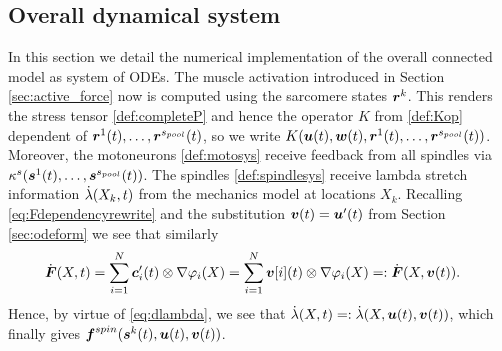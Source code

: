 \subsection{Overall dynamical system}
In this section we detail the numerical implementation of the overall connected model as system of ODEs.
The muscle activation introduced in Section \ref{sec:active_force} now is computed using the sarcomere states $\boldsymbol{r}^k$.
This renders the stress tensor \eqref{def:completeP} and hence the operator $K$ from \eqref{def:Kop} dependent of $\boldsymbol{r}^1(t),\ldots,\boldsymbol{r}^{s_{pool}}(t)$,
so we write $K(\boldsymbol{u}(t),\boldsymbol{w}(t),\boldsymbol{r}^1(t),\ldots,\boldsymbol{r}^{s_{pool}}(t))$.
Moreover, the motoneurons \eqref{def:motosys} receive feedback from all spindles via $\kappa^s(\boldsymbol{s}^1(t),\ldots,\boldsymbol{s}^{s_{pool}}(t))$.
The spindles \ref{def:spindlesys} receive lambda stretch information $\dot{\lambda}(X_k,t)$ from the mechanics model at locations $X_k$.
Recalling \eqref{eq:Fdependencyrewrite} and the substitution $\boldsymbol{v}(t) = \boldsymbol{u}'(t)$ from Section \ref{sec:odeform} we see that similarly
\begin{align}
	\dot{\boldsymbol{F}}(X,t) &= \sum\limits_{i=1}^{N} \boldsymbol{c}'_i(t)\otimes \nabla\varphi_i(X) = \sum\limits_{i=1}^{N} \boldsymbol{v}[i](t)\otimes \nabla\varphi_i(X) =: \dot{\boldsymbol{F}}(X,\boldsymbol{v}(t)).\label{eq:Fdotdependencyrewrite}
\end{align}
Hence, by virtue of \eqref{eq:dlambda}, we see that $\dot{\lambda}(X,t) =: \dot{\lambda}(X,\boldsymbol{u}(t),\boldsymbol{v}(t))$, which finally gives $\boldsymbol{f}^{spin}(\boldsymbol{s}^k(t),\boldsymbol{u}(t),\boldsymbol{v}(t))$.


